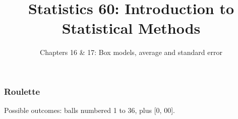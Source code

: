 \documentclass[handout]{beamer}
\title{Statistics 60: Introduction to Statistical Methods}
\subtitle{Chapters 16 \& 17: Box models, average and standard error}
\author{}%
\begin{document}
   \begin{frame}
   \titlepage
   \end{frame}



   \begin{frame}
   \frametitle{Roulette}
   \begin{center}
   \end{center}
   Possible outcomes: balls numbered 1 to 36, plus [0, 00].
   \end{frame}

\end{document}
